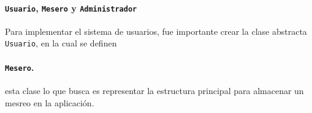 \paragraph{\texttt{Usuario}, \texttt{Mesero} y \texttt{Administrador}}
Para implementar el sistema de usuarios, fue importante crear la clase abstracta \texttt{Usuario},
en la cual se definen

\paragraph{\texttt{Mesero}.} esta clase lo que busca es representar la
estructura principal para almacenar un mesreo en la aplicación.